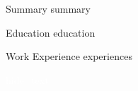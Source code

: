 \documentclass[]{resume_template}
\begin{document}
\resumeheader
{}
{}
{}  %
{}
{}  %
{}  %

\begin{section}{Summary}
    {{summary}}
\end{section}

\begin{section}{Education}
    {{education}}
\end{section}

\begin{section}{Work Experience}
    {{experiences}}
\end{section}



\begingroup
\fontsize{0.3528pt}{0.3528pt}\selectfont %
\textcolor{white}{{hide_text}}
\endgroup
\end{document}
